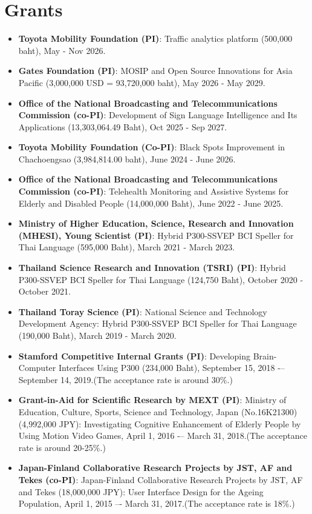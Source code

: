 \documentclass[letterpaper,11pt]{article}
\newcommand{\resumeItem}[2]{
  \item\small{
    \textbf{#1}{: #2 \vspace{-2pt}}
  }
}
\newcommand{\resumeSubItem}[2]{\resumeItem{#1}{#2}\vspace{-4pt}}
\newcommand{\resumeSubHeadingListStart}{\begin{itemize}[leftmargin=*]}
\newcommand{\resumeSubHeadingListEnd}{\end{itemize}}
\begin{document}
\section{Grants}
\resumeSubHeadingListStart
\resumeSubItem{Toyota Mobility Foundation (PI)}
{Traffic analytics platform (500,000 baht),  May - Nov 2026.}
\resumeSubItem{Gates Foundation (PI)}
{MOSIP and Open Source Innovations for Asia Pacific (3,000,000 USD = 93,720,000 baht),  May 2026 - May 2029.}
\resumeSubItem{Office of the National Broadcasting and Telecommunications Commission (co-PI)}
{Development of Sign Language Intelligence and Its Applications (13,303,064.49 Baht),  Oct 2025 - Sep 2027.}
\resumeSubItem{Toyota Mobility Foundation (Co-PI)}
{Black Spots Improvement in Chachoengsao (3,984,814.00 baht),  June 2024 - June 2026.}
\resumeSubItem{Office of the National Broadcasting and Telecommunications Commission (co-PI)}
{Telehealth Monitoring and Assistive Systems for Elderly and Disabled People (14,000,000 Baht),  June 2022 - June 2025.}
\resumeSubItem{Ministry of Higher Education, Science, Research and Innovation (MHESI), Young Scientist (PI)}
{Hybrid P300-SSVEP BCI Speller for Thai Language (595,000 Baht),  March 2021 - March 2023.}
\resumeSubItem{Thailand Science Research and Innovation (TSRI) (PI)}
{Hybrid P300-SSVEP BCI Speller for Thai Language (124,750 Baht),  October 2020 - October 2021.}
\resumeSubItem{Thailand Toray Science (PI)}
{National Science and Technology Development Agency: Hybrid P300-SSVEP BCI Speller for Thai Language (190,000 Baht),  March 2019 - March 2020.}
\resumeSubItem{Stamford Competitive Internal Grants (PI)}
{Developing Brain-Computer Interfaces Using P300 (234,000 Baht), September 15, 2018 -– September 14, 2019.(The acceptance rate is around 30\%.)}
\resumeSubItem{Grant-in-Aid for Scientific Research by MEXT (PI)}
{Ministry of Education, Culture, Sports, Science and Technology, Japan (No.16K21300) (4,992,000 JPY): Investigating Cognitive Enhancement of Elderly People by Using Motion Video Games, April 1, 2016 -– March 31, 2018.(The acceptance rate is around 20-25\%.)}
\resumeSubItem{Japan-Finland Collaborative Research Projects by JST, AF and Tekes (co-PI)}
{Japan-Finland Collaborative Research Projects by JST, AF and Tekes (18,000,000 JPY): User Interface Design for the Ageing Population, April 1, 2015 –- March 31, 2017.(The acceptance rate is 18\%.)}
\resumeSubHeadingListEnd

\end{document}
